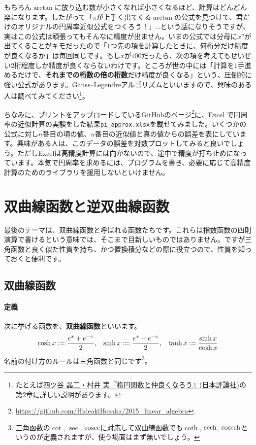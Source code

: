 もちろん$\arctan$に放り込む数が小さくなれば小さくなるほど、計算はどんどん楽になります。したがって「$\pi$が上手く出てくる$\arctan$の公式を見つけて、君だけのオリジナルの円周率近似公式をつくろう！」…という話になりそうですが、実はこの公式は頑張ってもそんなに精度が出ません。いまの公式では分母に$x^n$が出てくることがキモだったので「$1$つ先の項を計算したときに、何桁分だけ精度が良くなるか」は毎回同じです。もし$x$が$100$だったら、次の項を考えてもせいぜい$2$桁程度しか精度が良くならないわけです。ところが世の中には「計算を$1$手進めるだけで、\textbf{それまでの桁数の倍の桁数}だけ精度が良くなる」という、圧倒的に強い公式があります。Gauss--Legendreアルゴリズムといいますので、興味のある人は調べてみてください\footnote{たとえば\href{http://www.nippyo.co.jp/book/6387.html}{四ツ谷 晶二・村井 実『楕円関数と仲良くなろう』(日本評論社)}の第$2$章に詳しい説明があります。}。

ちなみに、プリントをアップロードしているGitHubのページ\footnote{\url{https://github.com/HideakiHosaka/2015_linear_algebra}}に、Excel で円周率の近似計算の実験をした結果\texttt{pi\_approx.xlsx}を載せてみました。いくつかの公式に対し$n$番目の項の値、$n$番目の近似値と真の値からの誤差を表にしています。興味がある人は、このデータの誤差を対数プロットしてみると良いでしょう。ただしExcelは高精度計算には向かないので、途中で精度が打ち止めになっています。本気で円周率を求めるには、プログラムを書き、必要に応じて高精度計算のためのライブラリを援用しないといけません。

\section{双曲線函数と逆双曲線函数}

最後のテーマは、双曲線函数と呼ばれる函数たちです。これらは指数函数の四則演算で書けるという意味では、そこまで目新しいものではありません。ですが三角函数と良く似た性質を持ち、かつ置換積分などの際に役立つので、性質を知っておくと便利です。

\subsection{双曲線函数}

\paragraph{定義}
次に挙げる函数を、\textbf{双曲線函数}といいます。
\begin{align*}
\cosh x &:= \frac{e^x+e^{-x}}{2}\index{cosh}, & \sinh x &:= \frac{e^x - e^{-x}}{2}\index{sinh}, & \tanh x := \frac{\sinh x}{\cosh x}\index{tanh}
\end{align*}
名前の付け方のルールは三角函数と同じです\footnote{三角函数の$\cot$, $\sec$, $\operatorname{cosec}$に対応して双曲線函数でも$\coth$, $\operatorname{sech}$, $\operatorname{cosech}$というのが定義されますが、使う場面はまず無いでしょう。}。

